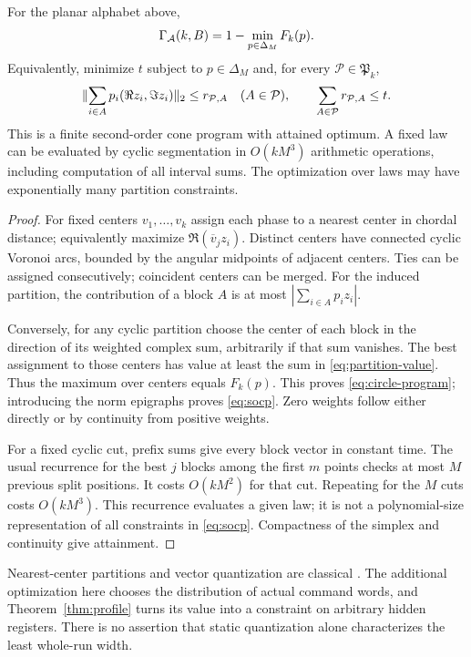 \begin{theorem}\label{thm:circle-socp}
For the planar alphabet above,
\begin{equation}\label{eq:circle-program}
 \Gamma_{\mathcal A}(k,B)=1-\min_{p\in\Delta_M}F_k(p).
\end{equation}
Equivalently, minimize $t$ subject to $p\in\Delta_M$ and, for every $\mathcal P\in\mathfrak P_k$,
\begin{equation}\label{eq:socp}
 \lVert\sum_{i\in A}p_i(\Re z_i,\Im z_i)\rVert_2\le r_{\mathcal P,A}
 \quad(A\in\mathcal P),\qquad
 \sum_{A\in\mathcal P}r_{\mathcal P,A}\le t.
\end{equation}
This is a finite second-order cone program with attained optimum. A fixed law can be evaluated by cyclic segmentation in $O(kM^3)$ arithmetic operations, including computation of all interval sums. The optimization over laws may have exponentially many partition constraints.
\end{theorem}
\begin{proof}
For fixed centers $v_1,\ldots,v_k$ assign each phase to a nearest center in chordal distance; equivalently maximize $\Re(\overline v_jz_i)$. Distinct centers have connected cyclic Voronoi arcs, bounded by the angular midpoints of adjacent centers. Ties can be assigned consecutively; coincident centers can be merged. For the induced partition, the contribution of a block $A$ is at most $|\sum_{i\in A}p_i z_i|$.

Conversely, for any cyclic partition choose the center of each block in the direction of its weighted complex sum, arbitrarily if that sum vanishes. The best assignment to those centers has value at least the sum in \eqref{eq:partition-value}. Thus the maximum over centers equals $F_k(p)$. This proves \eqref{eq:circle-program}; introducing the norm epigraphs proves \eqref{eq:socp}. Zero weights follow either directly or by continuity from positive weights.

For a fixed cyclic cut, prefix sums give every block vector in constant time. The usual recurrence for the best $j$ blocks among the first $m$ points checks at most $M$ previous split positions. It costs $O(kM^2)$ for that cut. Repeating for the $M$ cuts costs $O(kM^3)$. This recurrence evaluates a given law; it is not a polynomial-size representation of all constraints in \eqref{eq:socp}. Compactness of the simplex and continuity give attainment.
\end{proof}

Nearest-center partitions and vector quantization are classical \cite{GL}. The additional optimization here chooses the distribution of actual command words, and Theorem~\ref{thm:profile} turns its value into a constraint on arbitrary hidden registers. There is no assertion that static quantization alone characterizes the least whole-run width.

